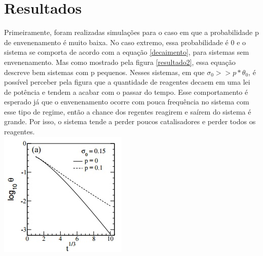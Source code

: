 
\section{Resultados}

Primeiramente, foram realizadas simulações para o caso em que a probabilidade p
de envenenamento é muito baixa. No caso extremo, essa probabilidade é 0 e o
sistema se comporta de acordo com a equação \ref{decaimento}, para sistemas sem
envenenamento. Mas como mostrado pela figura \ref{resultado2}, essa equação
descreve bem sistemas com p pequenos. Nesses sistemas, em que
$\sigma_0 >> p*\theta_0$, é possível perceber pela figura que a quantidade de
reagentes decaem em uma lei de potência e tendem a acabar com o passar do tempo.
Esse comportamento é esperado já que o envenenamento ocorre com pouca frequência
no sistema com esse tipo de regime, então a chance dos regentes reagirem e
saírem do sistema é grande. Por isso, o sistema tende a perder poucos catalisadores
e perder todos os reagentes.\\

{
	\captionsetup{type=figure}
	\includegraphics[width=\columnwidth]{./figures/052-Resultado.jpg}\\
	\label{resultado2}
}

